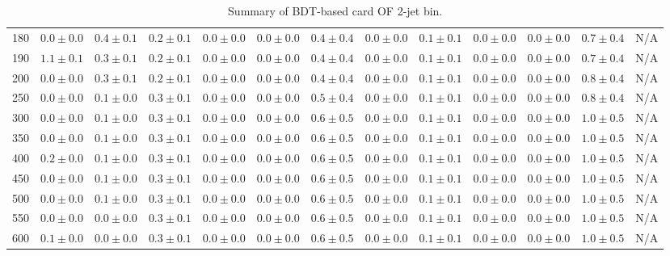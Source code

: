 \begin{table}
{\begin{center}
\begin{tabular}{l | c c | c c c c c c c c  | c c}
180 & $0.0\pm0.0$ & $0.4\pm0.1$ & $0.2\pm0.1$ & $0.0\pm0.0$ & $0.0\pm0.0$ & $0.4\pm0.4$ & $0.0\pm0.0$ & $0.1\pm0.1$ & $0.0\pm0.0$ & $0.0\pm0.0$ & $0.7\pm0.4$ & N/A \\
190 & $1.1\pm0.1$ & $0.3\pm0.1$ & $0.2\pm0.1$ & $0.0\pm0.0$ & $0.0\pm0.0$ & $0.4\pm0.4$ & $0.0\pm0.0$ & $0.1\pm0.1$ & $0.0\pm0.0$ & $0.0\pm0.0$ & $0.7\pm0.4$ & N/A \\
200 & $0.0\pm0.0$ & $0.3\pm0.1$ & $0.2\pm0.1$ & $0.0\pm0.0$ & $0.0\pm0.0$ & $0.4\pm0.4$ & $0.0\pm0.0$ & $0.1\pm0.1$ & $0.0\pm0.0$ & $0.0\pm0.0$ & $0.8\pm0.4$ & N/A \\
250 & $0.0\pm0.0$ & $0.1\pm0.0$ & $0.3\pm0.1$ & $0.0\pm0.0$ & $0.0\pm0.0$ & $0.5\pm0.4$ & $0.0\pm0.0$ & $0.1\pm0.1$ & $0.0\pm0.0$ & $0.0\pm0.0$ & $0.8\pm0.4$ & N/A \\
300 & $0.0\pm0.0$ & $0.1\pm0.0$ & $0.3\pm0.1$ & $0.0\pm0.0$ & $0.0\pm0.0$ & $0.6\pm0.5$ & $0.0\pm0.0$ & $0.1\pm0.1$ & $0.0\pm0.0$ & $0.0\pm0.0$ & $1.0\pm0.5$ & N/A \\
350 & $0.0\pm0.0$ & $0.1\pm0.0$ & $0.3\pm0.1$ & $0.0\pm0.0$ & $0.0\pm0.0$ & $0.6\pm0.5$ & $0.0\pm0.0$ & $0.1\pm0.1$ & $0.0\pm0.0$ & $0.0\pm0.0$ & $1.0\pm0.5$ & N/A \\
400 & $0.2\pm0.0$ & $0.1\pm0.0$ & $0.3\pm0.1$ & $0.0\pm0.0$ & $0.0\pm0.0$ & $0.6\pm0.5$ & $0.0\pm0.0$ & $0.1\pm0.1$ & $0.0\pm0.0$ & $0.0\pm0.0$ & $1.0\pm0.5$ & N/A \\
450 & $0.0\pm0.0$ & $0.1\pm0.0$ & $0.3\pm0.1$ & $0.0\pm0.0$ & $0.0\pm0.0$ & $0.6\pm0.5$ & $0.0\pm0.0$ & $0.1\pm0.1$ & $0.0\pm0.0$ & $0.0\pm0.0$ & $1.0\pm0.5$ & N/A \\
500 & $0.0\pm0.0$ & $0.1\pm0.0$ & $0.3\pm0.1$ & $0.0\pm0.0$ & $0.0\pm0.0$ & $0.6\pm0.5$ & $0.0\pm0.0$ & $0.1\pm0.1$ & $0.0\pm0.0$ & $0.0\pm0.0$ & $1.0\pm0.5$ & N/A \\
550 & $0.0\pm0.0$ & $0.0\pm0.0$ & $0.3\pm0.1$ & $0.0\pm0.0$ & $0.0\pm0.0$ & $0.6\pm0.5$ & $0.0\pm0.0$ & $0.1\pm0.1$ & $0.0\pm0.0$ & $0.0\pm0.0$ & $1.0\pm0.5$ & N/A \\
600 & $0.1\pm0.0$ & $0.0\pm0.0$ & $0.3\pm0.1$ & $0.0\pm0.0$ & $0.0\pm0.0$ & $0.6\pm0.5$ & $0.0\pm0.0$ & $0.1\pm0.1$ & $0.0\pm0.0$ & $0.0\pm0.0$ & $1.0\pm0.5$ & N/A \\
\hline
\end{tabular}
\end{center}
}
\caption{Summary of BDT-based card OF 2-jet bin.}
\end{table}
